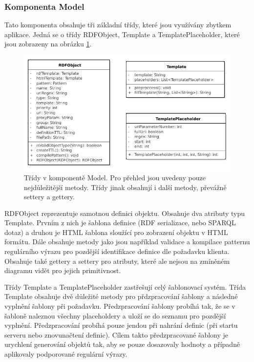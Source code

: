 \documentclass[thesis=B,czech]{FITthesis}[2012/06/26]
\begin{document}
    \subsubsection{Komponenta Model}\label{component_model}
    Tato komponenta obsahuje tři základní třídy, které jsou využívány zbytkem aplikace. Jedná se o třídy RDFObject, Template a TemplatePlaceholder, které jsou zobrazeny
    na obrázku \ref{model_class}.
    
     \begin{figure}\centering
	\includegraphics[width=\textwidth]{Model.pdf}
	\caption[Model tříd komponenty model]{Třídy v komponentě Model. Pro přehled jsou uvedeny pouze nejdůležitější metody. Třídy jinak obsahují i další metody, převážně settery a gettery.}\label{model_class}
    \end{figure}
    
    RDFObject reprezentuje samotnou definici objektu. Obsahuje dva atributy typu Template. Prvním z nich je šablona definice (RDF serializace, nebo SPARQL dotaz) a
    druhou je HTML šablona sloužící pro zobrazení objektu v HTML formátu. Dále obsahuje metody jako jsou například validace a kompilace patternu
    regulárního výrazu pro pozdější identifikace definice dle požadavku klienta. Obsahuje také gettery a settery pro atributy, které ale nejsou
    na zmíněném diagramu vidět pro jejich primitivnost.
    
    Třídy Template a TemplatePlaceholder zastřešují celý šablonovací systém. Třída Template obsahuje dvě důležité metody pro přdzpracování šablony
    a následné vyplnění šablony při požadavku. Předzpracování šablony probíhá tak, že se v šabloně naleznou všechny placeholdery a uloží se do seznamu
    pro pozdější vyplnění. Předzpracování probíhá pouze jendou při nahrání definic (při startu serveru nebo znovunačtení definic). Cílem takto
    předzpracované šablony je urychlení generování objektů tak, aby se pouze dosazovaly hodnoty a případně aplikovaly podporované regulární výrazy.
 
\end{document}
